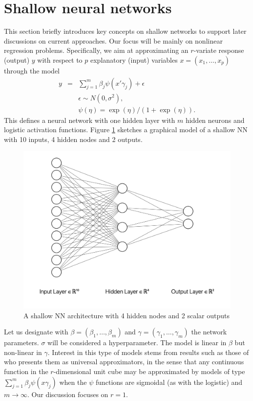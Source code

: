 \section{Shallow neural networks}
This section briefly introduces key concepts
on shallow networks to support later discussions on current approaches.
Our focus will be mainly on nonlinear regression 
problems. Specifically, we aim at approximating 
an $r$-variate response (output) $y$ with respect to $p$ explanatory 
(input) variables $x=(x_1,\ldots,x_p)$ through the 
model
\begin{eqnarray}\label{kantora}
  y         & = & \sum_{j=1}^m \beta_j \psi(x' \gamma_j) +
                    \epsilon %
                    \nonumber\\
              & & \epsilon \sim N(0,\sigma^2),
                  \nonumber \\
              & & \psi(\eta) = \exp(\eta)/(1+\exp(\eta)).
                  \end{eqnarray}
This defines a neural network with one hidden 
layer with $m$ hidden neurons and logistic 
activation functions.
Figure \ref{figuradkk1} sketches 
a graphical model of a shallow NN with 10 inputs, 4 hidden nodes and 
2 outputs. 
\begin{figure}
    \centering
    \includegraphics[scale=0.5]{figures/net1.png}
    \caption{A shallow NN architecture with 4 hidden nodes and 2 scalar outputs}
    \label{figuradkk1}
\end{figure}

Let us designate with $\beta=(\beta_1,\ldots,\beta_m)$ and $\gamma=(\gamma_1,\ldots,\gamma_m)$ the network parameters. $\sigma$  
will be considered a hyperparameter. The model
is linear in $\beta$ but non-linear in  
$\gamma$. Interest in this type of models stems from 
results such as those of \cite{cybenko1989approximation}
who presents them as universal approximators,
in the sense that any continuous function in the 
$r$-dimensional unit cube 
may be approximated by models of type
$\sum_{j=1}^m \beta_j \psi(x \gamma_j)$
when the $\psi$
functions are sigmoidal (as with the logistic) and
$m\rightarrow \infty$. Our discussion focuses on $r=1$.



